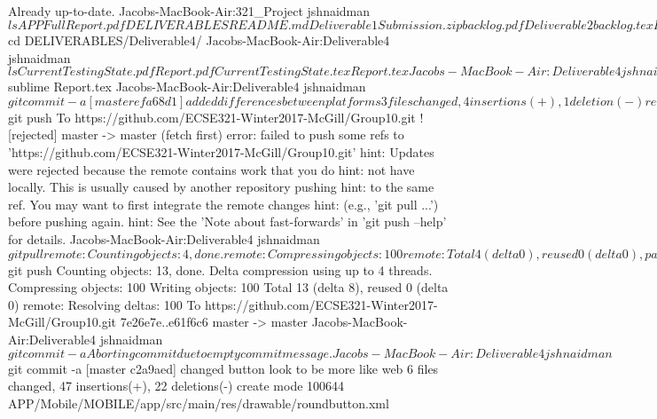 Already up-to-date.
Jacobs-MacBook-Air:321_Project jshnaidman$ ls
APP                        FullReport.pdf
DELIVERABLES               README.md
Deliverable1Submission.zip backlog.pdf
Deliverable2               backlog.tex
Feedback                   template.tex
Jacobs-MacBook-Air:321_Project jshnaidman$ cd DELIVERABLES/Deliverable4/
Jacobs-MacBook-Air:Deliverable4 jshnaidman$ ls
CurrentTestingState.pdf Report.pdf
CurrentTestingState.tex Report.tex
Jacobs-MacBook-Air:Deliverable4 jshnaidman$ sublime Report.tex
Jacobs-MacBook-Air:Deliverable4 jshnaidman$ git commit -a
[master efa68d1] added differences between platforms
 3 files changed, 4 insertions(+), 1 deletion(-)
 rewrite DELIVERABLES/Deliverable4/Report.pdf (93%
Jacobs-MacBook-Air:Deliverable4 jshnaidman$ git push
To https://github.com/ECSE321-Winter2017-McGill/Group10.git
 ! [rejected]        master -> master (fetch first)
error: failed to push some refs to 'https://github.com/ECSE321-Winter2017-McGill/Group10.git'
hint: Updates were rejected because the remote contains work that you do
hint: not have locally. This is usually caused by another repository pushing
hint: to the same ref. You may want to first integrate the remote changes
hint: (e.g., 'git pull ...') before pushing again.
hint: See the 'Note about fast-forwards' in 'git push --help' for details.
Jacobs-MacBook-Air:Deliverable4 jshnaidman$ git pull
remote: Counting objects: 4, done.
remote: Compressing objects: 100%
remote: Total 4 (delta 0), reused 0 (delta 0), pack-reused 0
Unpacking objects: 100%
From https://github.com/ECSE321-Winter2017-McGill/Group10
   830e69e..7e26e7e  master     -> origin/master
Merge made by the 'recursive' strategy.
 backlog.pdf | Bin 84659 -> 91414 bytes
 backlog.tex |   5 +++--
 2 files changed, 3 insertions(+), 2 deletions(-)
Jacobs-MacBook-Air:Deliverable4 jshnaidman$ git push
Counting objects: 13, done.
Delta compression using up to 4 threads.
Compressing objects: 100%
Writing objects: 100%
Total 13 (delta 8), reused 0 (delta 0)
remote: Resolving deltas: 100%
To https://github.com/ECSE321-Winter2017-McGill/Group10.git
   7e26e7e..e61f6c6  master -> master
Jacobs-MacBook-Air:Deliverable4 jshnaidman$ git commit -a
Aborting commit due to empty commit message.
Jacobs-MacBook-Air:Deliverable4 jshnaidman$ git commit -a
[master c2a9aed] changed button look to be more like web
 6 files changed, 47 insertions(+), 22 deletions(-)
 create mode 100644 APP/Mobile/MOBILE/app/src/main/res/drawable/roundbutton.xml
